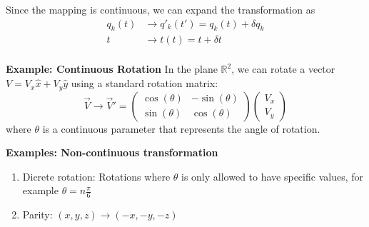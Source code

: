 \documentclass[11pt]{article}
\begin{document}
\vskip 0.5cm
Since the mapping is continuous, we can expand the transformation as 
\begin{align*}
  q_{k}(t) &\rightarrow q'_k(t') = q_{k}(t) + \delta q_{k} \\
  t &\rightarrow t(t) = t + \delta t \\
\end{align*}

\begin{redbox}
  \textbf{Example: Continuous Rotation}
  In the plane $\mathbb{R}^2$, we can rotate a vector $V = V_x \hat{x} + V_y \hat{y}$ using a standard rotation matrix:
  \[ \vec{V} \rightarrow \vec{V}' = \begin{pmatrix}
    \cos(\theta) & -\sin(\theta) \\
    \sin(\theta) & \cos(\theta) 
  \end{pmatrix} \begin{pmatrix}
    V_x \\
    V_y
  \end{pmatrix} \]
  where $\theta$ is a continuous parameter that represents the angle of rotation.
\end{redbox}

\begin{redbox}
  \textbf{Examples: Non-continuous transformation}
  \begin{enumerate}
    \item Dicrete rotation: Rotations where $\theta$ is only allowed to have specific values, for example $\theta =  n \frac{\pi}{6}$
    \item Parity: $(x,y,z) \rightarrow (-x,-y,-z)$
  \end{enumerate}
\end{redbox}
\end{document}

